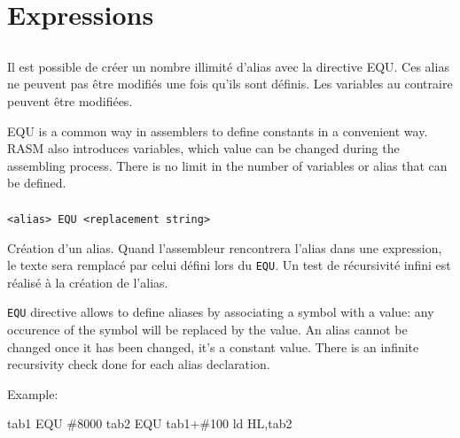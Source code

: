 \section{Expressions}

\subsection{}
\begin{xfr}
Il est possible de créer un nombre illimité d’alias avec la directive EQU.
Ces alias ne peuvent pas être modifiés une fois qu'ils sont définis.
Les variables au contraire peuvent être modifiées.
\end{xfr}

\begin{xen}
EQU is a common way in assemblers to define constants in a convenient way.
RASM also introduces variables, which value can be changed during the assembling process.
There is no limit in the number of variables or alias that can be defined.
\end{xen}

\subsubsection{}
\begin{verbatim}
<alias> EQU <replacement string>
\end{verbatim}

\begin{xfr}
Création d'un alias. Quand l'assembleur rencontrera l'alias dans une expression, le texte sera remplacé par celui défini lors du \texttt{EQU}.
Un test de récursivité infini est réalisé à la création de l'alias.
\end{xfr}

\begin{xen}
\texttt{EQU} directive allows to define aliases by associating a symbol with a value: any occurence of the symbol will be replaced by the value. An alias cannot be changed once it has been changed, it's a constant value.
There is an infinite recursivity check done for each alias declaration.
\end{xen}

Example:
\begin{code}
tab1 EQU \#8000
tab2 EQU tab1+\#100
ld HL,tab2
\end{code}

